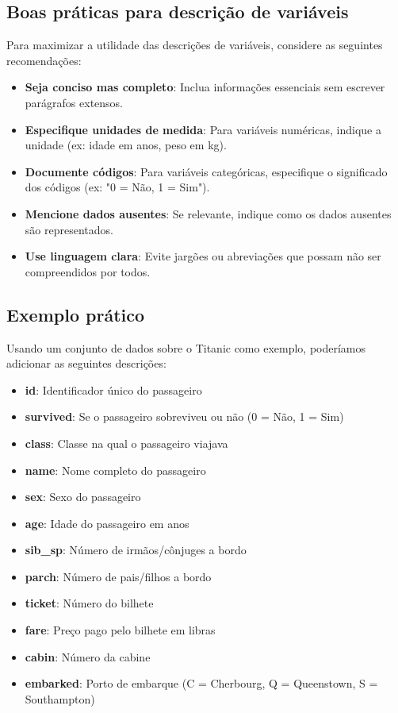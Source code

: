 
\subsection{Boas práticas para descrição de variáveis}

Para maximizar a utilidade das descrições de variáveis, considere as seguintes recomendações:

\begin{itemize}
    \item \textbf{Seja conciso mas completo}: Inclua informações essenciais sem escrever parágrafos extensos.
    \item \textbf{Especifique unidades de medida}: Para variáveis numéricas, indique a unidade (ex: idade em anos, peso em kg).
    \item \textbf{Documente códigos}: Para variáveis categóricas, especifique o significado dos códigos (ex: "0 = Não, 1 = Sim").
    \item \textbf{Mencione dados ausentes}: Se relevante, indique como os dados ausentes são representados.
    \item \textbf{Use linguagem clara}: Evite jargões ou abreviações que possam não ser compreendidos por todos.
\end{itemize}

\subsection{Exemplo prático}

Usando um conjunto de dados sobre o Titanic como exemplo, poderíamos adicionar as seguintes descrições:

\begin{itemize}
    \item \textbf{id}: Identificador único do passageiro
    \item \textbf{survived}: Se o passageiro sobreviveu ou não (0 = Não, 1 = Sim)
    \item \textbf{class}: Classe na qual o passageiro viajava
    \item \textbf{name}: Nome completo do passageiro
    \item \textbf{sex}: Sexo do passageiro
    \item \textbf{age}: Idade do passageiro em anos
    \item \textbf{sib\_sp}: Número de irmãos/cônjuges a bordo
    \item \textbf{parch}: Número de pais/filhos a bordo
    \item \textbf{ticket}: Número do bilhete
    \item \textbf{fare}: Preço pago pelo bilhete em libras
    \item \textbf{cabin}: Número da cabine
    \item \textbf{embarked}: Porto de embarque (C = Cherbourg, Q = Queenstown, S = Southampton)
\end{itemize}


